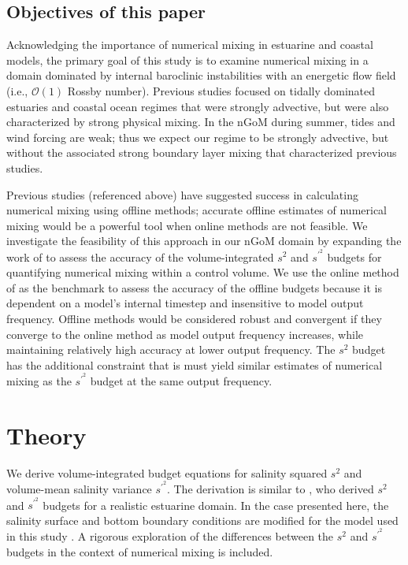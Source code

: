 \subsection{Objectives of this paper} \label{sec:objectives}

Acknowledging the importance of numerical mixing in estuarine and coastal models, the primary goal of this study is to examine numerical mixing in a domain dominated by internal baroclinic instabilities with an energetic flow field (i.e., $\mathcal{O}(1)$ Rossby number). Previous studies focused on tidally dominated estuaries \citep{Broatch_2022, MacCready_2018, Ralston_2017, Wang_2018} and coastal ocean \citep{Wang_2021} regimes that were strongly advective, but were also characterized by strong physical mixing. In the nGoM during summer, tides and wind forcing are weak; thus we expect our regime to be strongly advective, but without the associated strong boundary layer mixing that characterized previous studies.

Previous studies (referenced above) have suggested success in calculating numerical mixing using offline methods; accurate offline estimates of numerical mixing would be a powerful tool when online methods are not feasible. We investigate the feasibility of this approach in our nGoM domain by expanding the work of \citet{Wang_2021} to assess the accuracy of the volume-integrated $s^2$ and $s^{\prime^2}$ budgets for quantifying numerical mixing within a control volume. We use the online method of \citet{Burchard_2008} as the benchmark to assess the accuracy of the offline budgets because it is dependent on a model's internal timestep and insensitive to model output frequency. Offline methods would be considered robust and convergent if they converge to the online method as model output frequency increases, while maintaining relatively high accuracy at lower output frequency. The $s^2$ budget has the additional constraint that is must yield similar estimates of numerical mixing as the $s^{\prime^2}$ budget at the same output frequency. 

\section{Theory} \label{sec:theory}

We derive volume-integrated budget equations for salinity squared $s^2$ and volume-mean salinity variance $s^{\prime^2}$. The derivation is similar to \citet{Lorenz_2021}, who derived $s^2$ and $s^{\prime^2}$ budgets for a realistic estuarine domain. In the case presented here, the salinity surface and bottom boundary conditions are modified for the model used in this study \citep[Regional Ocean Modeling Systems, ROMS, ][]{shchepetkin2005regional}. A rigorous exploration of the differences between the $s^2$ and $s^{\prime^2}$ budgets in the context of numerical mixing is included. 

